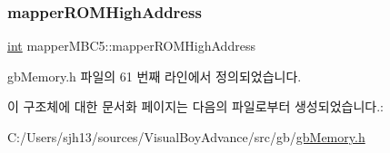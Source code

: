 \subsubsection{\texorpdfstring{mapper\+R\+O\+M\+High\+Address}{mapperROMHighAddress}}
{\footnotesize\ttfamily \mbox{\hyperlink{_util_8cpp_a0ef32aa8672df19503a49fab2d0c8071}{int}} mapper\+M\+B\+C5\+::mapper\+R\+O\+M\+High\+Address}



gb\+Memory.\+h 파일의 61 번째 라인에서 정의되었습니다.



이 구조체에 대한 문서화 페이지는 다음의 파일로부터 생성되었습니다.\+:\begin{DoxyCompactItemize}
\item 
C\+:/\+Users/sjh13/sources/\+Visual\+Boy\+Advance/src/gb/\mbox{\hyperlink{gb_memory_8h}{gb\+Memory.\+h}}\end{DoxyCompactItemize}
